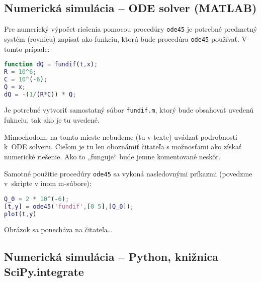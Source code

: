 \documentclass[a4paper, 10pt, ]{article}
\begin{document}
\begin{center}

    \vspace{-1mm}


    \vspace{-5mm}

	\label{sim_Q}

    \vspace{-1mm}

\end{center}











\subsection{Numerická simulácia -- ODE solver (MATLAB)}



Pre numerický výpočet riešenia pomocou procedúry \verb|ode45| je potrebné predmetný systém (rovnicu) zapísať ako funkciu, ktorú bude procedúra \verb|ode45| používať. V tomto prípade:
\begin{lstlisting}[language=Matlab,]
function dQ = fundif(t,x);
R = 10^6;
C = 10^(-6);
Q = x;
dQ = -(1/(R*C)) * Q;
\end{lstlisting}
Je potrebné vytvoriť samostatný súbor \verb|fundif.m|, ktorý bude obsahovať uvedenú fuknciu, tak ako je tu uvedené.

Mimochodom, na tomto mieste nebudeme (tu v texte) uvádzať podrobnosti k~ODE solveru. Cieľom je tu len oboznámiť čitateľa s možnosťami ako získať numerické riešenie. Ako to „funguje“ bude jemne komentované neskôr.

Samotné použitie procedúry \verb|ode45| sa vykoná nasledovnými príkazmi (povedzme v~skripte v inom m-súbore):
\begin{lstlisting}[language=Matlab,]
Q_0 = 2 * 10^(-6);
[t,y] = ode45('fundif',[0 5],[Q_0]);
plot(t,y)
\end{lstlisting}
Obrázok sa ponecháva na čitateľa\ldots



\subsection{Numerická simulácia -- Python, knižnica SciPy.integrate}
\end{document}
